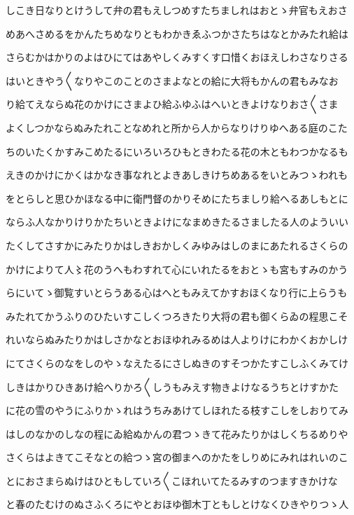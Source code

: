 \documentclass[a4paper,11pt,landscape]{ltjtarticle}
\begin{document}
しこき日なりとけうして弁の君もえしつめすたちましれはおとゝ弁官もえおさ
\par\medskip
めあへさめるをかんたちめなりともわかきゑふつかさたちはなとかみたれ給は
\par\medskip
さらむかはかりのよはひにてはあやしくみすくす口惜くおほえしわさなりさる
\par\medskip
はいときやう〱なりやこのことのさまよなとの給に大将もかんの君もみなお
\par\medskip
り給てえならぬ花のかけにさまよひ給ふゆふはへいときよけなりおさ〱さま
\par\medskip
よくしつかならぬみたれことなめれと所から人からなりけりゆへある庭のこた
\par\medskip
ちのいたくかすみこめたるにいろいろひもときわたる花の木ともわつかなるも
\par\medskip
えきのかけにかくはかなき事なれとよきあしきけちめあるをいとみつゝわれも
\par\medskip
をとらしと思ひかほなる中に衛門督のかりそめにたちましり給へるあしもとに
\par\medskip
ならふ人なかりけりかたちいときよけになまめきたるさましたる人のよういい
\par\medskip
たくしてさすかにみたりかはしきおかしくみゆみはしのまにあたれるさくらの
\par\medskip
かけによりて人〻花のうへもわすれて心にいれたるをおとゝも宮もすみのかう
\par\medskip
らにいてゝ御覧すいとらうある心はへともみえてかすおほくなり行に上らうも
\par\medskip
みたれてかうふりのひたいすこしくつろきたり大将の君も御くらゐの程思こそ
\par\medskip
れいならぬみたりかはしさかなとおほゆれみるめは人よりけにわかくおかしけ
\par\medskip
にてさくらのなをしのやゝなえたるにさしぬきのすそつかたすこしふくみてけ
\par\medskip
しきはかりひきあけ給へりかろ〱しうもみえす物きよけなるうちとけすかた
\par\medskip
に花の雪のやうにふりかゝれはうちみあけてしほれたる枝すこしをしおりてみ
\par\medskip
はしのなかのしなの程にゐ給ぬかんの君つゝきて花みたりかはしくちるめりや
\par\medskip
さくらはよきてこそなとの給つゝ宮の御まへのかたをしりめにみれはれいのこ
\par\medskip
とにおさまらぬけはひともしていろ〱こほれいてたるみすのつますきかけな
\par\medskip
と春のたむけのぬさふくろにやとおほゆ御木丁ともしとけなくひきやりつゝ人
\end{document}
